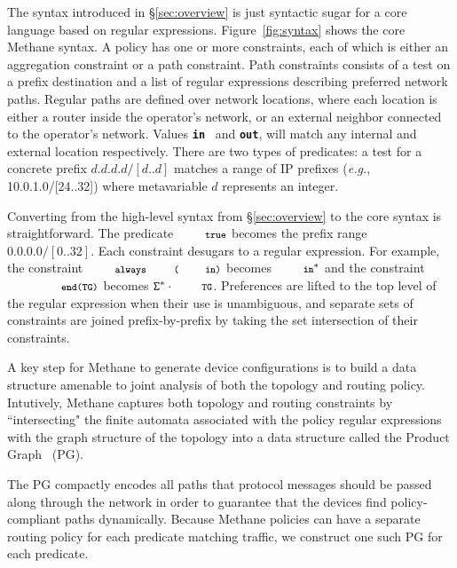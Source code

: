 \documentclass[numbers, 10pt, preprint]{sigplanconf}
\newcommand{\EG}{\emph{e.g.}}
\newcommand{\sysname}{{\small \sf Methane}\xspace}
\newcommand{\CD}[1]{\texttt{\small #1}}  %
\newcommand{\KW}[1]{\texttt{\small\bfseries{#1}}}
\newcommand{\True}{\CD{true}}
\newcommand{\Prefer}{\texttt{>>}}
\newcommand{\Path}{\texttt{=>}}
\newcommand{\In}{\KW{in}}
\newcommand{\Out}{\KW{out}}
\newcommand{\Exit}{\KW{exit}}
\newcommand{\End}{\KW{end}}
\newcommand{\Always}{\KW{always}}
\begin{document}
The syntax introduced in \S\ref{sec:overview} is just syntactic sugar for a core language based on regular expressions. Figure~\ref{fig:syntax} shows the core \sysname syntax.
%
A policy has one or more constraints, each of which is either an aggregation constraint or a path constraint. Path constraints consists of a test on a prefix destination and a list of regular expressions describing preferred network paths. Regular paths are defined over network locations, where each location is either a router inside the operator's network, or an external neighbor connected to the operator's network. Values \In~ and \Out, will match any internal and external location respectively. There are two types of predicates: a test for a concrete prefix $d.d.d.d/[d..d]$ matches a range of IP prefixes (\EG, 10.0.1.0/[24..32]) where metavariable $d$ represents an integer.

Converting from the high-level syntax from \S\ref{sec:overview} to the core syntax is straightforward. The predicate $\True$ becomes the prefix range $0.0.0.0/[0..32]$.
%
Each constraint desugars to a regular expression. For example, the constraint $\Always\CD{(\In)}$ becomes $\In^*$ and the constraint $\CD{\End(TG)}$ becomes $\mathtt{\Sigma}^* \cdot \CD{TG}$.
%
Preferences are lifted to the top level of the regular expression when their use is unambiguous, and separate sets of constraints are joined prefix-by-prefix by taking the set intersection of their constraints.

%
%

A key step for \sysname to generate device configurations is to build a data structure amenable to joint analysis of both the topology and routing policy. Intutively, \sysname captures both topology and routing constraints by ``intersecting" the finite automata associated with the policy regular expressions with the graph structure of the topology into a data structure called the Product Graph~\cite{propane} (PG).

The PG compactly encodes all paths that protocol messages should be passed along through the network in order to guarantee that the devices find policy-compliant paths dynamically.
%
%
Because \sysname policies can have a separate routing policy for each predicate matching traffic, we construct one such PG for each predicate.
\end{document}
